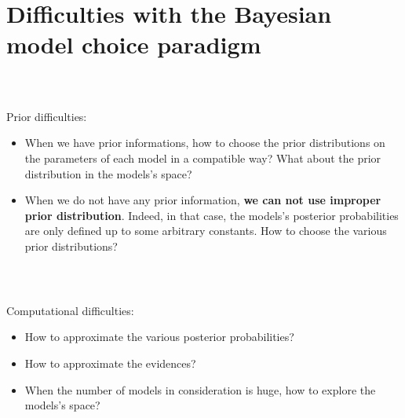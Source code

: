 \documentclass[notes,professionalfont,11pt,usenames,dvipsnames]{beamer}
\newcommand{\vs}{\bigskip}
\newcommand\justify{\rightskip0pt \leftskip0pt}
\newenvironment{slide}
{\begin{frame}[environment=slide]
\frametitle{\insertsection \\ \insertsubsection}\justify\setlength{\parskip}{0.5cm}\vspace{-1.5cm}}
{\end{frame}}
\begin{document}
\section{Difficulties with the Bayesian model choice paradigm}

\begin{slide}

\vs Prior difficulties: 
\begin{itemize}

\item When we have prior informations, how to choose the prior distributions
on the parameters of each model in a compatible way? 
What about the prior distribution in the models's space? 

\vs \item When we do not have any prior information, \textbf{we can not use improper prior distribution}.
Indeed, in that case, the models's posterior probabilities are only defined up to some arbitrary constants.
How to choose the various prior distributions?
\end{itemize}

\end{slide}

\begin{slide}

Computational difficulties:
\begin{itemize}
\item How to approximate the various posterior probabilities?
\item How to approximate the evidences?
\item When the number of models in consideration is huge, how to explore the models's space?
\end{itemize}

\label{lastslide}

\end{slide}
\end{document}
